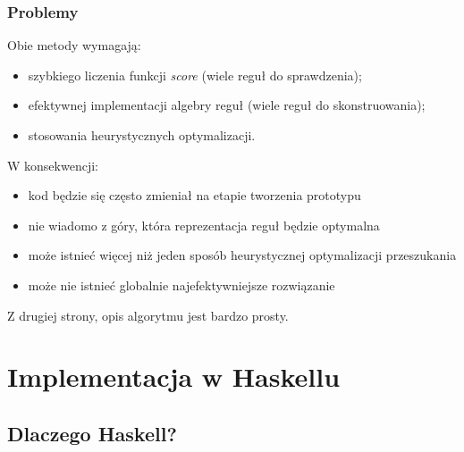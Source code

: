 \documentclass[8pt]{beamer}
\begin{document}
\begin{frame}
  \frametitle{Problemy}
  Obie metody wymagają:
  \begin{itemize}
  \item szybkiego liczenia funkcji \emph{score} (wiele reguł do sprawdzenia);
  \item efektywnej implementacji algebry reguł (wiele reguł do skonstruowania);
  \item stosowania heurystycznych optymalizacji.
  \end{itemize}

  \pause

  W konsekwencji:
  \begin{itemize}
    \item kod będzie się często zmieniał na etapie tworzenia prototypu
    \item nie wiadomo z góry, która reprezentacja reguł będzie optymalna
    \item może istnieć więcej niż jeden sposób heurystycznej optymalizacji
      przeszukania
    \item może nie istnieć globalnie najefektywniejsze rozwiązanie
  \end{itemize}

  Z drugiej strony, opis algorytmu jest bardzo prosty.
\end{frame}

\section{Implementacja w Haskellu}

\subsection{Dlaczego Haskell?}
\end{document}
